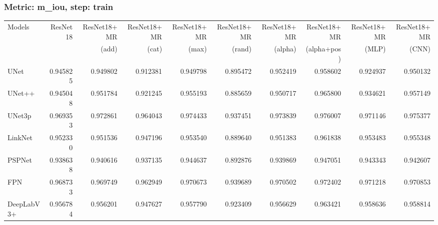 \documentclass{article}
\begin{document}
\subsubsection{Metric: m\_iou, step: train}
\begin{tabular}{lrrrrrrrrr}
\toprule
Models & ResNet18 & ResNet18+MR & ResNet18+MR & ResNet18+MR & ResNet18+MR & ResNet18+MR & ResNet18+MR & ResNet18+MR & ResNet18+MR \\
       &          &       (add) &       (cat) &       (max) &      (rand) &     (alpha) & (alpha+pos) &       (MLP) &       (CNN) \\
\midrule
UNet & 0.945825 & 0.949802 & 0.912381 & 0.949798 & 0.895472 & 0.952419 & 0.958602 & 0.924937 & 0.950132 \\
UNet++ & 0.945048 & 0.951784 & 0.921245 & 0.955193 & 0.885659 & 0.950717 & 0.965800 & 0.934621 & 0.957149 \\
UNet3p & 0.969353 & 0.972861 & 0.964043 & 0.974433 & 0.937451 & 0.973839 & 0.976007 & 0.971146 & 0.975377 \\
LinkNet & 0.952330 & 0.951536 & 0.947196 & 0.953540 & 0.889640 & 0.951383 & 0.961838 & 0.953483 & 0.955348 \\
PSPNet & 0.938638 & 0.940616 & 0.937135 & 0.944637 & 0.892876 & 0.939869 & 0.947051 & 0.943343 & 0.942607 \\
FPN & 0.968733 & 0.969749 & 0.962949 & 0.970673 & 0.939689 & 0.970502 & 0.972402 & 0.971218 & 0.970853 \\
DeepLabV3+ & 0.956784 & 0.956201 & 0.947627 & 0.957790 & 0.923409 & 0.956629 & 0.963421 & 0.958636 & 0.958814 \\
\bottomrule
\end{tabular}
\end{document}
